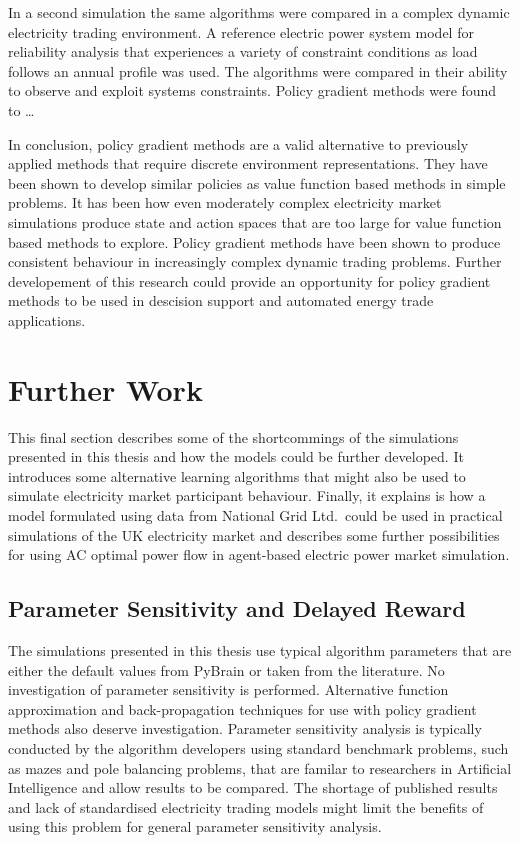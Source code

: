 In a second simulation the same algorithms were compared in a complex dynamic
electricity trading environment.  A reference electric power system model for
reliability analysis that experiences a variety of constraint conditions as
load follows an annual profile was used.  The algorithms were compared in their
ability to observe and exploit systems constraints.  Policy gradient methods
were found to \ldots

In conclusion, policy gradient methods are a valid alternative to previously
applied methods that require discrete environment representations.  They have
been shown to develop similar policies as value function based methods in
simple problems.  It has been how even moderately complex electricity market
simulations produce state and action spaces that are too large for value
function based methods to explore.  Policy gradient methods have been shown to
produce consistent behaviour in increasingly complex dynamic trading problems.
Further developement of this research could provide an opportunity for policy
gradient methods to be used in descision support and automated energy trade
applications.

\section{Further Work}
\label{sec:furtherwork}
This final section describes some of the shortcommings of the simulations
presented in this thesis and how the models could be further developed.  It
introduces some alternative learning algorithms that might also be used to
simulate electricity market participant behaviour.
Finally, it explains is how a model formulated using data from National Grid
Ltd.~could be used in practical simulations of the UK electricity market and
describes some further possibilities for using AC optimal power flow in
agent-based electric power market simulation.

\subsection{Parameter Sensitivity and Delayed Reward}
The simulations presented in this thesis use typical algorithm parameters that
are either the default values from PyBrain or taken from the literature. No
investigation of parameter sensitivity is performed. Alternative function
approximation and back-propagation techniques for use with policy gradient
methods also deserve investigation.  Parameter sensitivity analysis is typically
conducted by the algorithm developers using standard benchmark problems, such as
mazes and pole balancing problems, that are familar to researchers in Artificial
Intelligence and allow results to be compared. The shortage of published results
and lack of standardised electricity trading models might limit the benefits of
using this problem for general parameter sensitivity analysis.

